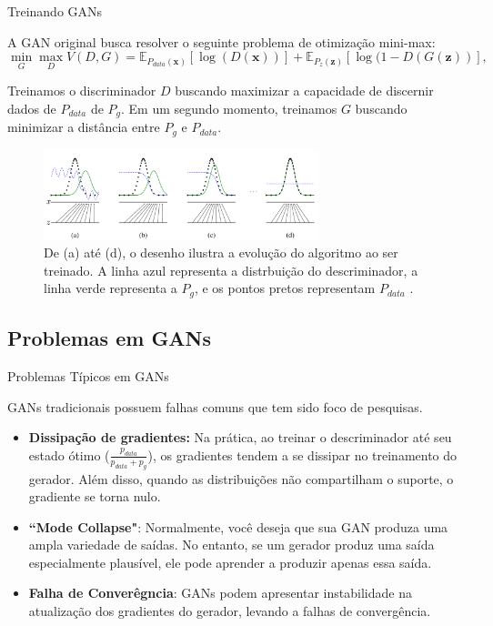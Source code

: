 \documentclass[10pt]{beamer}
\begin{document}
\begin{frame}[fragile]{Treinando GANs}

	A GAN original busca resolver o seguinte problema de otimização mini-max:
	\begin{equation*}
		\min_{G} \max_D V(D,G) =
		\mathbb{E}_{P_{data}(\bm x)}\left[\log{(D(\bm x))}\right]+
		\mathbb{E}_{P_z(\bm z)}\left[\log(1-D(G(\bm z))\right],
	\end{equation*}

	Treinamos o discriminador $D$ buscando maximizar
	a capacidade de discernir dados de $P_{data}$ de $P_g$.
	Em um segundo momento, treinamos $G$ buscando minimizar
	a distância entre $P_g$ e $P_{data}$.

	\begin{figure}[H]
		\centering
		\includegraphics[width=8cm]{Figures/gan-algorithmscheme.png}
		\caption{De (a) até (d), o desenho ilustra a evolução do
			algoritmo ao ser treinado. A linha azul representa a
			distrbuição do descriminador, a linha verde representa
			a $P_g$, e os pontos pretos representam $P_{data}$
			\citep{goodfellow2014}.}
	\end{figure}

\end{frame}

\subsection{Problemas em GANs}
\begin{frame}[fragile]{Problemas Típicos em GANs}

	GANs tradicionais possuem falhas comuns que tem sido foco
	de pesquisas.
	\small

	\begin{itemize}
		\item \textbf{Dissipação de gradientes:} Na prática, ao treinar
		      o descriminador até seu estado ótimo ($\frac{p_{data}}
			      {p_{data} + p_g}$), os gradientes tendem a se dissipar
		      no treinamento do gerador. Além disso, quando as distribuições
		      não compartilham o suporte, o gradiente se torna nulo.

		\item  \textbf{``Mode Collapse"}: Normalmente, você deseja que sua GAN
		      produza uma ampla variedade de saídas. No entanto, se um gerador produz
		      uma saída especialmente plausível, ele pode aprender a produzir apenas
		      essa saída.

		\item \textbf{Falha de Converêgncia}: GANs podem apresentar instabilidade
		      na atualização dos gradientes do gerador, levando a falhas de
		      convergência.
	\end{itemize}

\end{frame}
\end{document}
